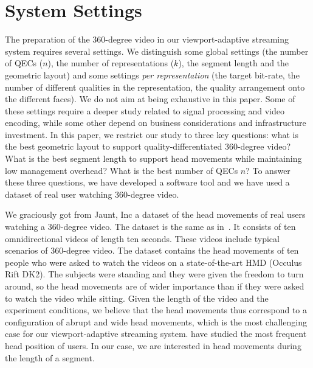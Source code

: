 \section{System Settings}
\label{sec:settings}

The preparation of the 360-degree video in our viewport-adaptive streaming system
requires several settings. We distinguish some global settings (the number of \acp{QEC} ($n$),
the number of representations ($k$), the segment length and the geometric layout)
and some settings \emph{per representation}
(the target bit-rate, the number of different qualities in the representation, the quality
arrangement onto the different
faces). We do not aim
at being exhaustive in this paper. Some of these settings require a deeper study related to
signal processing and video encoding, while some other depend on business considerations and infrastructure investment. In this paper, we restrict our study
to three key questions: what is the best geometric layout to support quality-differentiated 360-degree
video? What is the best segment length to support head movements while maintaining low
management overhead? What is the best number of \acp{QEC} $n$? To answer these three questions,
we have developed a software tool and we have used a dataset of real user watching 360-degree
video.


We graciously got from Jaunt, Inc a dataset of the head movements
of real users watching a 360-degree video. The dataset is the same as
in~\cite{yu_framework_2015}. It consists of
ten omnidirectional videos of length ten seconds. These videos include
typical scenarios of 360-degree video. The dataset contains
the head movements of ten people who were asked to watch the videos on
a state-of-the-art \ac{HMD} (Occulus Rift DK2). The subjects were
standing and they were given the freedom to turn around, so the head
movements are of wider importance than if they were asked to watch the
video while sitting. Given the length of the video and the experiment
conditions, we believe that the head movements thus correspond to a
configuration of abrupt and wide head movements, which is the most
challenging case for our viewport-adaptive streaming system.
\citet{yu_framework_2015} have studied the most frequent head position of users.
In our case, we are interested in head movements during the
length of a segment.

